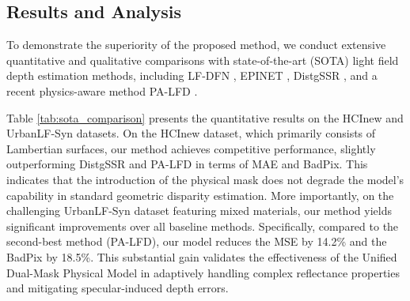 \documentclass[lettersize,journal]{IEEEtran}
\begin{document}
\subsection{Results and Analysis}

To demonstrate the superiority of the proposed method, we conduct extensive quantitative and qualitative comparisons with state-of-the-art (SOTA) light field depth estimation methods, including LF-DFN , EPINET , DistgSSR , and a recent physics-aware method PA-LFD . 

Table \ref{tab:sota_comparison} presents the quantitative results on the HCInew and UrbanLF-Syn datasets. On the HCInew dataset, which primarily consists of Lambertian surfaces, our method achieves competitive performance, slightly outperforming DistgSSR and PA-LFD in terms of MAE and BadPix. This indicates that the introduction of the physical mask does not degrade the model's capability in standard geometric disparity estimation. More importantly, on the challenging UrbanLF-Syn dataset featuring mixed materials, our method yields significant improvements over all baseline methods. Specifically, compared to the second-best method (PA-LFD), our model reduces the MSE by 14.2\% and the BadPix by 18.5\%. This substantial gain validates the effectiveness of the Unified Dual-Mask Physical Model in adaptively handling complex reflectance properties and mitigating specular-induced depth errors.

\begin{table}[htbp]
\centering
\caption{Quantitative Comparison with State-of-the-Art Methods on HCInew and UrbanLF-Syn Datasets}
\label{tab:sota_comparison}
\end{table}
\end{document}
